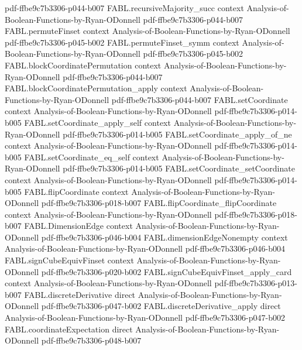 \begin{theorem}
  {pdf-ffbe9c7b3306-p044-b007}
\proofstep
  {FABL.recursiveMajority_succ}
  {context}
  {Analysis-of-Boolean-Functions-by-Ryan-ODonnell}
  {pdf-ffbe9c7b3306-p044-b007}
\proofstep
  {FABL.permuteFinset}
  {context}
  {Analysis-of-Boolean-Functions-by-Ryan-ODonnell}
  {pdf-ffbe9c7b3306-p045-b002}
\proofstep
  {FABL.permuteFinset_symm}
  {context}
  {Analysis-of-Boolean-Functions-by-Ryan-ODonnell}
  {pdf-ffbe9c7b3306-p045-b002}
\proofstep
  {FABL.blockCoordinatePermutation}
  {context}
  {Analysis-of-Boolean-Functions-by-Ryan-ODonnell}
  {pdf-ffbe9c7b3306-p044-b007}
\proofstep
  {FABL.blockCoordinatePermutation_apply}
  {context}
  {Analysis-of-Boolean-Functions-by-Ryan-ODonnell}
  {pdf-ffbe9c7b3306-p044-b007}
\proofstep
  {FABL.setCoordinate}
  {context}
  {Analysis-of-Boolean-Functions-by-Ryan-ODonnell}
  {pdf-ffbe9c7b3306-p014-b005}
\proofstep
  {FABL.setCoordinate_apply_self}
  {context}
  {Analysis-of-Boolean-Functions-by-Ryan-ODonnell}
  {pdf-ffbe9c7b3306-p014-b005}
\proofstep
  {FABL.setCoordinate_apply_of_ne}
  {context}
  {Analysis-of-Boolean-Functions-by-Ryan-ODonnell}
  {pdf-ffbe9c7b3306-p014-b005}
\proofstep
  {FABL.setCoordinate_eq_self}
  {context}
  {Analysis-of-Boolean-Functions-by-Ryan-ODonnell}
  {pdf-ffbe9c7b3306-p014-b005}
\proofstep
  {FABL.setCoordinate_setCoordinate}
  {context}
  {Analysis-of-Boolean-Functions-by-Ryan-ODonnell}
  {pdf-ffbe9c7b3306-p014-b005}
\proofstep
  {FABL.flipCoordinate}
  {context}
  {Analysis-of-Boolean-Functions-by-Ryan-ODonnell}
  {pdf-ffbe9c7b3306-p018-b007}
\proofstep
  {FABL.flipCoordinate_flipCoordinate}
  {context}
  {Analysis-of-Boolean-Functions-by-Ryan-ODonnell}
  {pdf-ffbe9c7b3306-p018-b007}
\proofstep
  {FABL.DimensionEdge}
  {context}
  {Analysis-of-Boolean-Functions-by-Ryan-ODonnell}
  {pdf-ffbe9c7b3306-p046-b004}
\proofstep
  {FABL.dimensionEdgeNonempty}
  {context}
  {Analysis-of-Boolean-Functions-by-Ryan-ODonnell}
  {pdf-ffbe9c7b3306-p046-b004}
\proofstep
  {FABL.signCubeEquivFinset}
  {context}
  {Analysis-of-Boolean-Functions-by-Ryan-ODonnell}
  {pdf-ffbe9c7b3306-p020-b002}
\proofstep
  {FABL.signCubeEquivFinset_apply_card}
  {context}
  {Analysis-of-Boolean-Functions-by-Ryan-ODonnell}
  {pdf-ffbe9c7b3306-p013-b007}
\proofstep
  {FABL.discreteDerivative}
  {direct}
  {Analysis-of-Boolean-Functions-by-Ryan-ODonnell}
  {pdf-ffbe9c7b3306-p047-b002}
\proofstep
  {FABL.discreteDerivative_apply}
  {direct}
  {Analysis-of-Boolean-Functions-by-Ryan-ODonnell}
  {pdf-ffbe9c7b3306-p047-b002}
\proofstep
  {FABL.coordinateExpectation}
  {direct}
  {Analysis-of-Boolean-Functions-by-Ryan-ODonnell}
  {pdf-ffbe9c7b3306-p048-b007}

\end{theorem}
